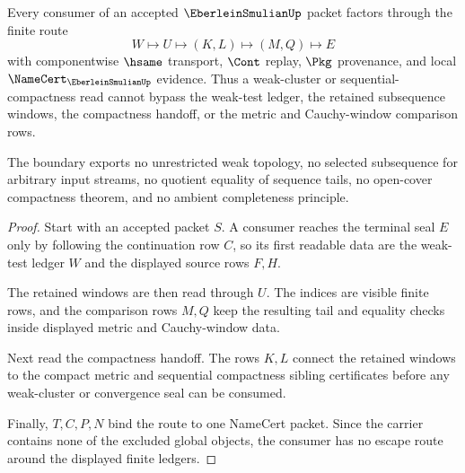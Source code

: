\begin{theorem}
\label{thm:eberlein-smulian-nonescape-boundary}
Every consumer of an accepted $\EberleinSmulianUp$ packet factors through the finite route
$$
W \longmapsto U \longmapsto (K,L) \longmapsto (M,Q) \longmapsto E
$$
with componentwise $\hsame$ transport, $\Cont$ replay, $\Pkg$ provenance, and local $\NameCert_{\EberleinSmulianUp}$ evidence. Thus a weak-cluster or sequential-compactness read cannot bypass the weak-test ledger, the retained subsequence windows, the compactness handoff, or the metric and Cauchy-window comparison rows.

The boundary exports no unrestricted weak topology, no selected subsequence for arbitrary input streams, no quotient equality of sequence tails, no open-cover compactness theorem, and no ambient completeness principle.
\end{theorem}
\begin{proof}
Start with an accepted packet $S$. A consumer reaches the terminal seal $E$ only by following the continuation row $C$, so its first readable data are the weak-test ledger $W$ and the displayed source rows $F,H$.

The retained windows are then read through $U$. The indices are visible finite rows, and the comparison rows $M,Q$ keep the resulting tail and equality checks inside displayed metric and Cauchy-window data.

Next read the compactness handoff. The rows $K,L$ connect the retained windows to the compact metric and sequential compactness sibling certificates before any weak-cluster or convergence seal can be consumed.

Finally, $T,C,P,N$ bind the route to one NameCert packet. Since the carrier contains none of the excluded global objects, the consumer has no escape route around the displayed finite ledgers.
\end{proof}


